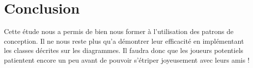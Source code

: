 \section{Conclusion}
Cette étude nous a permis de bien nous former à l'utilisation des patrons de conception.
Il ne nous reste plus qu'a démontrer leur efficacité en implémentant les classes décrites sur les diagrammes.
Il faudra donc que les joueurs potentiels patientent encore un peu avant de pouvoir s'étriper joyeusement avec leurs amis !
